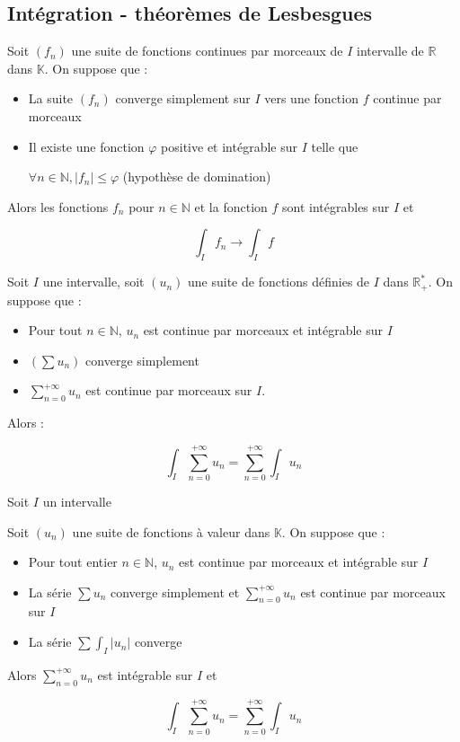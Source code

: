 \documentclass[a4paper,12pt]{book}
\newcommand{\Thr}[2]{\begin{tcolorbox}[sharp corners, colback=white,colframe=red!10!blue!30!green!75!, title=Théorème : #1]#2\end{tcolorbox}}
\def\R{\mathbb{R}}
\def\N{\mathbb{N}}
\def\K{\mathbb{K}}
\begin{document}
\subsection{Intégration - théorèmes de Lesbesgues}
\Thr{de convergence dominée}{Soit $(f_n)$ une suite de fonctions continues par morceaux de $I$ intervalle de $\R$ dans $\K$. On suppose que :\begin{itemize}
\item La suite $(f_n)$ converge simplement sur $I$ vers une fonction $f$ continue par morceaux
\item Il existe une fonction $\varphi$ positive et intégrable sur $I$ telle que
\par\begin{center}$\forall n\in\N, \vert f_n\vert\leq\varphi$ (hypothèse de domination)\end{center}
\end{itemize}
Alors les fonctions $f_n$ pour $n\in\N$ et la fonction $f$ sont intégrables sur $I$ et
\par$$\int_If_n\to\int_If$$}
\Thr{Intégration terme à terme positive}{Soit $I$ une intervalle, soit $(u_n)$ une suite de fonctions définies de $I$ dans $\R_+^*$. On suppose que :\begin{itemize}
\item Pour tout $n\in\N$, $u_n$ est continue par morceaux et intégrable sur $I$
\item $(\sum u_n)$ converge simplement
\item $\sum\limits_{n=0}^{+\infty}u_n$ est continue par morceaux sur $I$.
\end{itemize} 
Alors :
\par $$\int_I\sum\limits_{n=0}^{+\infty}u_n = \sum\limits_{n=0}^{+\infty}\int_I u_n$$}
\Thr{Intégration terme à terme}{Soit $I$ un intervalle \par Soit $(u_n)$ une suite de fonctions à valeur dans $\K$. On suppose que :\begin{itemize}
\item Pour tout entier $n\in\N$, $u_n$ est continue par morceaux et intégrable sur $I$
\item La série $\sum u_n$ converge simplement et $\sum\limits_{n=0}^{+\infty}u_n$ est continue par morceaux sur $I$
\item La série $\sum\int_I\vert u_n\vert$ converge
\end{itemize}
Alors $\sum\limits_{n=0}^{+\infty}u_n$ est intégrable sur $I$ et
\par $$\int_I\sum\limits_{n=0}^{+\infty}u_n=\sum\limits_{n=0}^{+\infty}\int_Iu_n$$}
\end{document}
